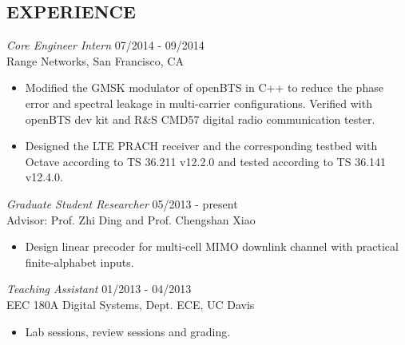 \documentclass[margin]{res} %
\begin{document}
\begin{resume}
     
        \section{EXPERIENCE}
    
        {\sl Core Engineer Intern} \hfill 07/2014 - 09/2014 \\
        Range Networks, San Francisco, CA
        \begin{itemize} \itemsep -2pt %
            \item Modified the GMSK modulator of openBTS in C++ to reduce the phase
            error and spectral leakage in multi-carrier configurations. Verified
            with openBTS dev kit and R\&S CMD57 digital radio communication
            tester.
            \item Designed the LTE PRACH receiver and the corresponding testbed with
            Octave according to TS 36.211 v12.2.0 and tested according to TS 36.141
            v12.4.0.
        \end{itemize}
     
        {\sl Graduate Student Researcher} \hfill 05/2013 - present \\
        Advisor: Prof. Zhi Ding and Prof. Chengshan Xiao 
        \begin{itemize} 
            \item Design linear precoder for multi-cell MIMO downlink channel with
            practical finite-alphabet inputs.
        \end{itemize} 
        
        {\sl Teaching Assistant} \hfill 01/2013 - 04/2013 \\
        EEC 180A Digital Systems, Dept. ECE, UC Davis
        \begin{itemize} 
            \item Lab sessions, review sessions and grading.
        \end{itemize} 
    
    

\end{resume}
\end{document}
